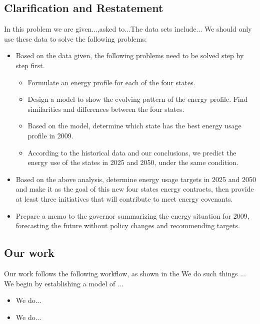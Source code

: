 \subsection{Clarification and Restatement}
In this problem we are given...,asked to...The data sets include...
We should only use these data to solve the following problems:
\begin{itemize}
    \item Based on the data given, the following problems need to be solved step by step first. 
    \begin{itemize}
        \item[-]Formulate an energy profile for each of the four states.
        \item[-]Design a model to show the evolving pattern of the energy profile. Find similarities and differences between the four states.
        \item[-]Based on the model, determine which state has the best energy usage profile in 2009.
        \item[-]According to the historical data and our conclusions, we predict the energy use of the states in 2025 and 2050, under the same condition.
    \end{itemize}
    \item Based on the above analysis, determine energy usage targets in 2025 and 2050 and make it as the goal of this new four states energy contracts, then provide at least three initiatives that will contribute to meet energy covenants. 
    \item Prepare a memo to the governor summarizing the energy situation for 2009, forecasting the future without policy changes and recommending targets.
\end{itemize}



\subsection{Our work}
Our work follows the following workflow, as shown in the 
We do such things ...
We begin by establishing a model of ...
\begin{itemize}                %
    \item We do...
    \item We do...
\end{itemize}